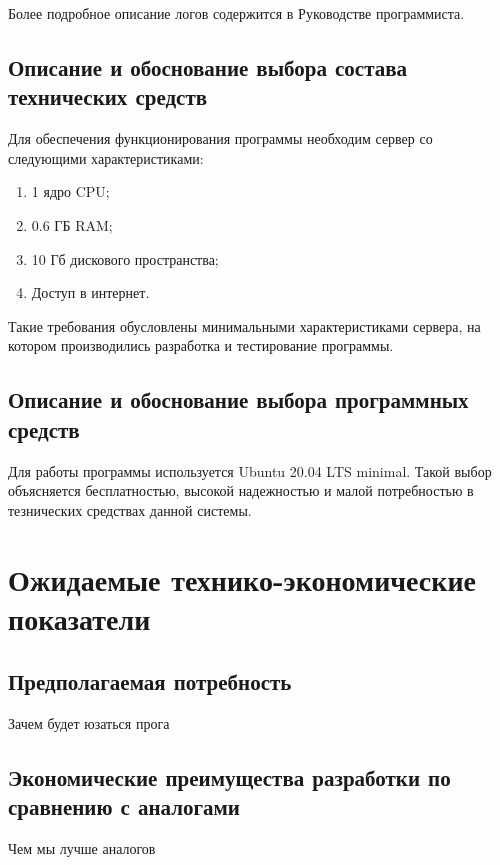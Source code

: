 \documentclass[explnote]{espd}
\begin{document}
Более подробное описание логов содержится в Руководстве программиста.

\subsection{Описание и обоснование выбора состава технических средств}
Для обеспечения функционирования программы необходим сервер со следующими характеристиками:

\begin{enumerate}
\item 1 ядро CPU;
\item 0.6 ГБ RAM;
\item 10 Гб дискового пространства;
\item Доступ в интернет.
\end{enumerate}

Такие требования обусловлены минимальными характеристиками сервера, на котором производились разработка и тестирование программы.

\subsection{Описание и обоснование выбора программных средств}
Для работы программы используется Ubuntu 20.04 LTS minimal. Такой выбор объясняется бесплатностью, высокой надежностью и малой потребностью в тезнических средствах данной системы.

\section{Ожидаемые технико-экономические показатели}
\subsection{Предполагаемая потребность}
Зачем будет юзаться прога

\subsection{Экономические преимущества разработки по сравнению с аналогами}
Чем мы лучше аналогов



\begin{terms}
\end{terms}
\end{document}
